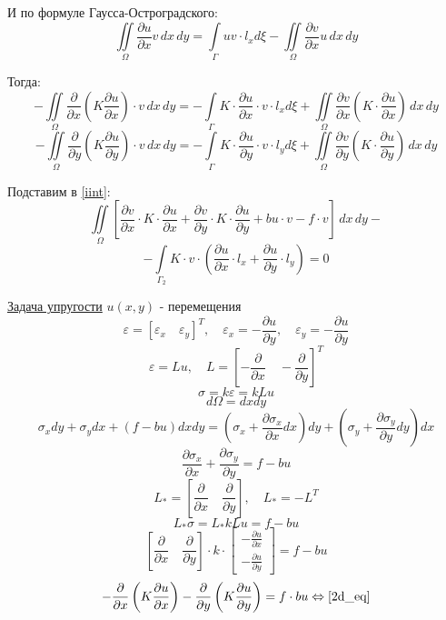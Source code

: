 \documentclass{bmstu}
\begin{document}
	И по формуле Гаусса-Остроградского:
	\[\iint\limits_{\Omega} \frac{\partial u}{\partial x} v \, dx \, dy = \int \limits_{\Gamma} uv \cdot l_x d \xi - \iint\limits_{\Omega} \frac{\partial v}{\partial x} u \, dx \, dy\]
	
	Тогда:
	\[-\iint\limits_{\Omega} \frac{\partial}{\partial x} \left( K \frac{\partial u}{\partial x} \right) \cdot v \, dx \, dy = 
	-\int \limits_{\Gamma} K \cdot \frac{\partial u}{\partial x} \cdot v \cdot l_x d \xi + \iint\limits_{\Omega} \frac{\partial v}{\partial x} \left(  K \cdot \frac{\partial u}{\partial x} \right) \, dx \, dy\]
	\[-\iint\limits_{\Omega} \frac{\partial}{\partial y} \left( K \frac{\partial u}{\partial y} \right) \cdot v \, dx \, dy = 
	-\int \limits_{\Gamma} K \cdot \frac{\partial u}{\partial y} \cdot v \cdot l_y d \xi + \iint\limits_{\Omega} \frac{\partial v}{\partial y} \left(  K \cdot \frac{\partial u}{\partial y} \right) \, dx \, dy\]
	
	Подставим в \eqref{iint}:
	\[\iint\limits_{\Omega} \left [ \frac{\partial v}{\partial x} \cdot K \cdot \frac{\partial u}{\partial x} + \frac{\partial v}{\partial y} \cdot K \cdot \frac{\partial u}{\partial y} + bu \cdot v - f  \cdot v \right ] \, dx \, dy -\]
	\[-\int \limits_{\Gamma_2} K \cdot v \cdot \left(\frac{\partial u}{\partial x} \cdot l_x + \frac{\partial u}{\partial y} \cdot l_y \right) = 0\]

	\underline{Задача упругости}
 	$ u(x, y) $ - перемещения \\
 	\[ \varepsilon = [\varepsilon_x \quad \varepsilon_y]^T, \quad \varepsilon_x = - \frac{\partial u}{\partial y},\quad \varepsilon_y = - \frac{\partial u}{\partial y} \]
	\[ \varepsilon = Lu,\quad L = \left[- \frac{\partial}{\partial x} \quad - \frac{\partial}{\partial y}\right]^T \]
	\[ \sigma = k \varepsilon = kLu \]
	\[ d \Omega = dxdy \]
	\[ \sigma_x dy + \sigma_y dx + (f-bu) dxdy = \left(\sigma_x + \frac{\partial \sigma_x}{\partial x}dx\right) dy + \left(\sigma_y + \frac{\partial \sigma_y}{\partial y}dy\right) dx \]
	\[ \frac{\partial \sigma_x}{\partial x} + \frac{\partial \sigma_y}{\partial y} = f - bu \]
	\[ L_* = \left[\frac{\partial}{\partial x} \quad \frac{\partial}{\partial y}\right],\quad L_* = -L^T \]
	\[ L_* \sigma = L_*kLu = f - bu \]
	\[ \left[\frac{\partial}{\partial x} \quad \frac{\partial}{\partial y}\right] \cdot k \cdot 
	\begin{bmatrix}
		-\frac{\partial u}{\partial x}\\
		- \frac{\partial u}{\partial y}
	\end{bmatrix}
 	= f-bu \]
	\[-\frac{\partial}{\partial x} \left ( K \frac{\partial u}{\partial x} \right) - \frac{\partial}{\partial y} \left ( K \frac{\partial u}{\partial y} \right) = f \cdot bu \Leftrightarrow \eqref{2d_eq}\]
	
\end{document}
